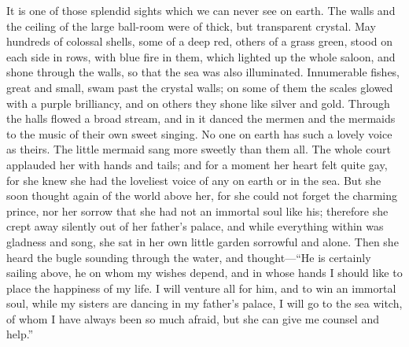 It is one of those splendid sights which we can never see on earth.
The walls and the ceiling of the large ball-room were of thick, but transparent crystal.
May hundreds of colossal shells, some of a deep red, others of a grass green, stood on each side in rows, with blue fire in them, which lighted up the whole saloon, and shone through the walls, so that the sea was also illuminated.
Innumerable fishes, great and small, swam past the crystal walls; on some of them the scales glowed with a purple brilliancy, and on others they shone like silver and gold.
Through the halls flowed a broad stream, and in it danced the mermen and the mermaids to the music of their own sweet singing.
No one on earth has such a lovely voice as theirs.
The little mermaid sang more sweetly than them all.
The whole court applauded her with hands and tails; and for a moment her heart felt quite gay, for she knew she had the loveliest voice of any on earth or in the sea.
But she soon thought again of the world above her, for she could not forget the charming prince, nor her sorrow that she had not an immortal soul like his; therefore she crept away silently out of her father’s palace, and while everything within was gladness and song, she sat in her own little garden sorrowful and alone.
Then she heard the bugle sounding through the water, and thought—``He is certainly sailing above, he on whom my wishes depend, and in whose hands I should like to place the happiness of my life.
I will venture all for him, and to win an immortal soul, while my sisters are dancing in my father’s palace, I will go to the sea witch, of whom I have always been so much afraid, but she can give me counsel and help.''

